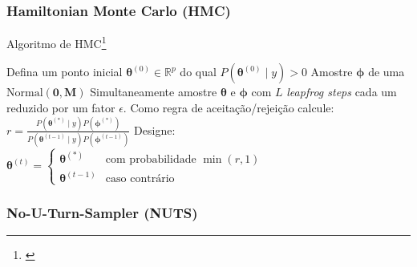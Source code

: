 \subsubsection{Hamiltonian Monte Carlo (HMC)}
\begin{frame}[fragile]{Algoritmo de HMC\footnote{\citet{neal2011mcmc}}}
    \footnotesize
    
    \SetAlCapFnt{\footnotesize}
    \SetAlCapNameFnt{\footnotesize}
    \begin{algorithm}[H]
    \DontPrintSemicolon
    \SetAlgoNoEnd
    \SetAlgoLined
    Defina um ponto inicial $\boldsymbol{\theta}^{(0)} \in \mathbb{R}^p$ do qual $P\left(\boldsymbol{\theta}^{(0)} \mid y \right) > 0$\;
    Amostre $\boldsymbol{\phi}$ de uma $\text{Normal}(\mathbf{0},\mathbf{M})$\;
    Simultaneamente amostre $\boldsymbol{\theta}$ e $\boldsymbol{\phi}$ com $L$ \textit{leapfrog steps} cada um reduzido por um fator $\epsilon$.\;
    Como regra de aceitação/rejeição calcule:
    $r = \frac{P \left(\boldsymbol{\theta}^{(*)} \mid y \right) P \left(\boldsymbol{\phi}^{(*)} \right)}{P \left(\boldsymbol{\theta}^{(t-1)} \mid y \right) P \left(\boldsymbol{\phi}^{(t-1)} \right)}$\;
    Designe:
      $
        \boldsymbol{\theta}^{(t)} =
          \begin{cases}
          \boldsymbol{\theta}^{(*)} & \text{com probabilidade $\min(r,1)$}\\
          \boldsymbol{\theta}^{(t-1)} & \text{caso contrário}
        \end{cases}
      $\;
    \caption{Hamiltonian Monte Carlo (HMC)}
    \end{algorithm}
\end{frame}

\subsubsection{No-U-Turn-Sampler (NUTS)}

